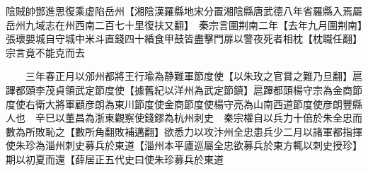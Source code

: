 陰賊帥鄧進思復乘虚陷岳州【湘陰漢羅縣地宋分置湘陰縣唐武德八年省羅縣入焉屬岳州九域志在州西南二百七十里復扶又翻】　秦宗言圍荆南二年【去年九月圍荆南】張瓌嬰城自守城中米斗直錢四十緍食甲鼓皆盡擊門扉以警夜死者相枕【枕職任翻】宗言竟不能克而去

　　三年春正月以邠州都將王行瑜為静難軍節度使【以朱玫之官賞之難乃旦翻】扈蹕都頭李茂貞領武定節度使【據舊紀以洋州為武定節鎮】扈蹕都頭楊守宗為金商節度使右衛大將軍顧彦朗為東川節度使金商節度使楊守亮為山南西道節度使彦朗豐縣人也　辛巳以董昌為浙東觀察使錢鏐為杭州刺史　秦宗權自以兵力十倍於朱全忠而數為所敗恥之【數所角翻敗補邁翻】欲悉力以攻汴州全忠患兵少二月以諸軍都指揮使朱珍為淄州刺史募兵於東道【淄州本平廬巡屬全忠欲募兵於東方輒以刺史授珍】期以初夏而還【薛居正五代史曰使朱珍募兵於東道